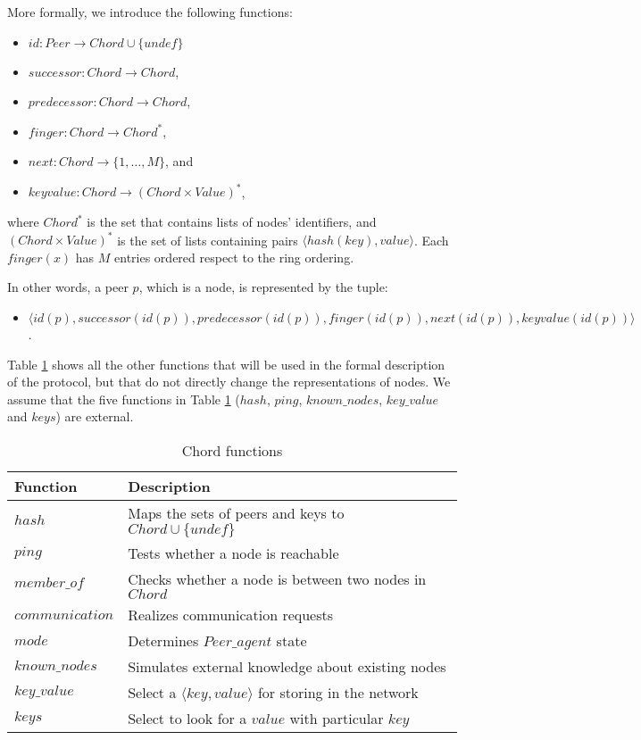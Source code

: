 \documentclass{amsart}
\theoremstyle{definition}
\begin{document}
More formally, we introduce the following functions:
\begin{itemize}
    \item $id: Peer \rightarrow Chord \cup \{ undef \}$
    \item $successor : Chord \rightarrow Chord$,
    \item $predecessor: Chord \rightarrow Chord$,
    \item $finger: Chord \rightarrow Chord^*$,
    \item $next:  Chord \rightarrow \{1, \ldots, M\}$, and
    \item $keyvalue: Chord \rightarrow (Chord \times Value)^*$,
\end{itemize}
where $Chord^*$ is the set that contains lists of nodes' identifiers, and $(Chord \times Value)^*$ is the set of lists
containing pairs $\langle hash(key), value \rangle$. Each $finger(x)$ has $M$ entries ordered respect to the ring ordering.

In other words, a peer $p$, which is a node, is represented by the tuple:
\begin{itemize}
    \item $\langle id(p), successor(id(p)), predecessor(id(p)), finger(id(p)), next(id(p)), keyvalue(id(p)) \rangle$.
\end{itemize}

Table \ref{chord_functions} shows all the other functions that
will be used in the formal description of the protocol, but that
do not directly change the representations of nodes. We assume
that the five functions in Table \ref{chord_functions} ($hash$,
$ping$,
$known\_nodes$, $key\_value$ and $keys$) are external.

\begin{table}
\centering
\begin{tabular}[]{|l|l|}
\hline \textbf{Function} & \textbf{Description}  \\
\hline
$hash$ & Maps the sets of peers and keys to $Chord \cup \{ undef \}$\\
\hline
$ping$ & Tests whether a node is reachable \\
\hline
$member\_of$ & Checks whether a node is between two nodes in $Chord$  \\
\hline
$communication$ & Realizes communication requests \\
\hline
$mode$ & Determines $Peer\_agent$ state \\
\hline
$known\_nodes$ & Simulates external knowledge about existing nodes \\
\hline
$key\_value$ & Select a $\langle key, value\rangle$ for storing in the network\\
\hline
$keys$ & Select to look for a $value$ with particular $key$\\
\hline
\end{tabular}

\caption{Chord functions} \label{chord_functions}
\end{table}
\end{document}
